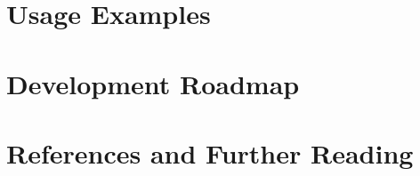 \documentclass[12pt]{report}
\begin{document}

\chapter{Usage Examples}

\chapter{Development Roadmap}

\appendix
\chapter{References and Further Reading}
\end{document}
